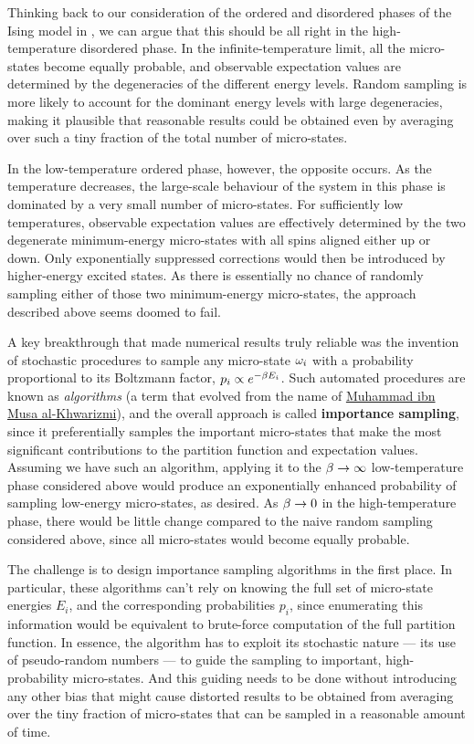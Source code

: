 Thinking back to our consideration of the ordered and disordered phases of the Ising model in , we can argue that this should be all right in the high-temperature disordered phase.
In the infinite-temperature limit, all the micro-states become equally probable, and observable expectation values are determined by the degeneracies of the different energy levels.
Random sampling is more likely to account for the dominant energy levels with large degeneracies, making it plausible that reasonable results could be obtained even by averaging over such a tiny fraction of the total number of micro-states.

In the low-temperature ordered phase, however, the opposite occurs.
As the temperature decreases, the large-scale behaviour of the system in this phase is dominated by a very small number of micro-states.
For sufficiently low temperatures, observable expectation values are effectively determined by the two degenerate minimum-energy micro-states with all spins aligned either up or down.
Only exponentially suppressed corrections would then be introduced by higher-energy excited states.
As there is essentially no chance of randomly sampling either of those two minimum-energy micro-states, the approach described above seems doomed to fail.

A key breakthrough that made numerical results truly reliable was the invention of stochastic procedures to sample any micro-state $\omega_i$ with a probability proportional to its Boltzmann factor, $p_i \propto e^{-\beta E_i}$.
Such automated procedures are known as \textit{algorithms} (a term that evolved from the name of \href{https://en.wikipedia.org/wiki/Muhammad_ibn_Musa_al-Khwarizmi}{Muhammad ibn Musa al-Khwarizmi}), and the overall approach is called \textbf{importance sampling}, since it preferentially samples the important micro-states that make the most significant contributions to the partition function and expectation values. %
Assuming we have such an algorithm, applying it to the $\beta \to \infty$ low-temperature phase considered above would produce an exponentially enhanced probability of sampling low-energy micro-states, as desired.
As $\beta \to 0$ in the high-temperature phase, there would be little change compared to the naive random sampling considered above, since all micro-states would become equally probable.

The challenge is to design importance sampling algorithms in the first place.
In particular, these algorithms can't rely on knowing the full set of micro-state energies $E_i$, and the corresponding probabilities $p_i$, since enumerating this information would be equivalent to brute-force computation of the full partition function.
In essence, the algorithm has to exploit its stochastic nature --- its use of pseudo-random numbers --- to guide the sampling to important, high-probability micro-states.
And this guiding needs to be done without introducing any other bias that might cause distorted results to be obtained from averaging over the tiny fraction of micro-states that can be sampled in a reasonable amount of time.

